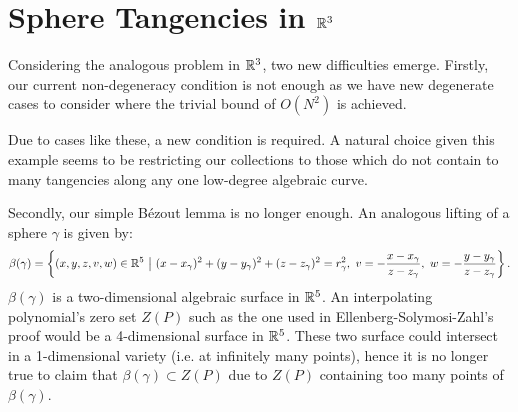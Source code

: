 \section{Sphere Tangencies in $\mathbb R^{3}$}
Considering the analogous problem in $\mathbb R^{3}$, two new difficulties emerge. 
Firstly, our current non-degeneracy condition is not enough as we have new degenerate cases to consider where the trivial bound of $O(N^2)$ is achieved. 
\begin{example}
\end{example}
Due to cases like these, a new condition is required. A natural choice given this example seems to be restricting our collections to those which do not contain to many tangencies along any one low-degree algebraic curve. 

Secondly, our simple Bézout lemma is no longer enough. An analogous lifting of a sphere $\gamma$ is given by:
\[
\beta(\gamma) = \left \{ (x,y,z,v,w) \in \mathbb R^5 \ \big | \ (x-x_\gamma)^2 + (y-y_\gamma)^2 + (z-z_\gamma)^2 = r_\gamma^2, \ v = - \frac{x-x_\gamma}{z-z_\gamma}, \ w = - \frac{y-y_\gamma}{z-z_\gamma} \right \}.
\]
$\beta(\gamma)$ is a two-dimensional algebraic surface in $\mathbb R^5$. An interpolating polynomial's zero set $Z(P)$ such as the one used in Ellenberg-Solymosi-Zahl's proof would be a 4-dimensional surface in $\mathbb R^5$.
These two surface could intersect in a 1-dimensional variety (i.e. at infinitely many points), hence it is no longer true to claim that $\beta(\gamma) \subset Z(P)$ due to $Z(P)$ containing too many points of $\beta(\gamma)$.
 